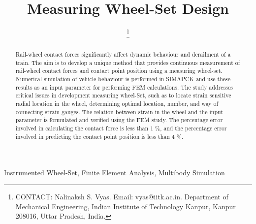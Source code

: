 \documentclass[]{interact}
\theoremstyle{plain}%
\theoremstyle{definition}
\theoremstyle{remark}
\begin{document}

\title{Measuring Wheel-Set Design}

\author{
 \thanks{CONTACT: Nalinaksh S. Vyas. Email: vyas@iitk.ac.in. Department of Mechanical Engineering, Indian Institute of Technology Kanpur, Kanpur 208016, Uttar Pradesh, India.}
}

\maketitle

\begin{abstract}
Rail-wheel contact forces significantly affect dynamic behaviour and derailment of a train. The aim is to develop a unique method that provides continuous measurement of rail-wheel contact forces and contact point position using a measuring wheel-set. Numerical simulation of vehicle behaviour is performed in SIMAPCK and use these results as an input parameter for performing FEM calculations. The study addresses critical issues in development measuring wheel-Set, such as to locate strain sensitive radial location in the wheel, determining optimal location, number, and way of connecting strain gauges. The relation between strain in the wheel and the input parameter is formulated and verified using the FEM study. The percentage error involved in calculating the contact force is less than 1 \%, and the percentage error involved in predicting the contact point position is less than 4 \%. 
\end{abstract}

\begin{keywords}
Instrumented Wheel-Set, Finite Element Analysis, Multibody Simulation 
\end{keywords}
\end{document}
